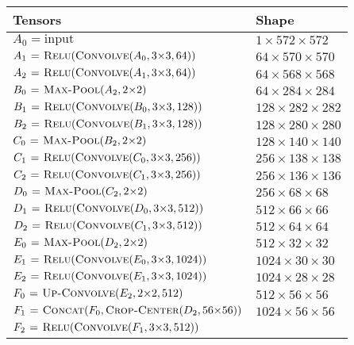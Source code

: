 \documentclass[10pt]{article}
\begin{document}
\begin{itemize}
  	\begin{table}
  	\centering
  	\begin{tabular}{l|l}
  	\textbf{Tensors} & \textbf{Shape} \\
  	\hline
  	$A_0 = \textrm{input}$
  	& $1 \times 572 \times 572$ \\
  	$A_1 \mathrel{\hspace{1pt}=\hspace{1pt}} \textnormal{\scshape Relu}(\textnormal{\scshape Convolve}(A_0, 3{\times}3, 64))$ 
  	& $64 \times 570 \times 570$ \\
  	$A_2 \mathrel{\hspace{1pt}=\hspace{1pt}} \textnormal{\scshape Relu}(\textnormal{\scshape Convolve}(A_1, 3{\times}3, 64))$ 
  	& $64 \times 568 \times 568$ \\
  	\hline
  	$B_0 \mathrel{\hspace{1pt}=\hspace{1pt}} \textnormal{\scshape Max-Pool}(A_2, 2{\times}2)$
  	& $64 \times 284 \times 284$ \\
  	$B_1 \mathrel{\hspace{1pt}=\hspace{1pt}} \textnormal{\scshape Relu}(\textnormal{\scshape Convolve}(B_0, 3{\times}3, 128))$ 
  	& $128 \times 282 \times 282$ \\
  	$B_2 \mathrel{\hspace{1pt}=\hspace{1pt}} \textnormal{\scshape Relu}(\textnormal{\scshape Convolve}(B_1, 3{\times}3, 128))$ 
  	& $128 \times 280 \times 280$ \\
  	\hline
  	$C_0 \mathrel{\hspace{1pt}=\hspace{1pt}} \textnormal{\scshape Max-Pool}(B_2, 2{\times}2)$
  	& $128 \times 140 \times 140$ \\
  	$C_1 \mathrel{\hspace{1pt}=\hspace{1pt}} \textnormal{\scshape Relu}(\textnormal{\scshape Convolve}(C_0, 3{\times}3, 256))$ 
  	& $256 \times 138 \times 138$ \\
  	$C_2 \mathrel{\hspace{1pt}=\hspace{1pt}} \textnormal{\scshape Relu}(\textnormal{\scshape Convolve}(C_1, 3{\times}3, 256))$ 
  	& $256 \times 136 \times 136$ \\
  	\hline
  	$D_0 \mathrel{\hspace{1pt}=\hspace{1pt}} \textnormal{\scshape Max-Pool}(C_2, 2{\times}2)$
  	& $256 \times 68 \times 68$ \\
  	$D_1 \mathrel{\hspace{1pt}=\hspace{1pt}} \textnormal{\scshape Relu}(\textnormal{\scshape Convolve}(D_0, 3{\times}3, 512))$ 
  	& $512 \times 66 \times 66$ \\
  	$D_2 \mathrel{\hspace{1pt}=\hspace{1pt}} \textnormal{\scshape Relu}(\textnormal{\scshape Convolve}(C_1, 3{\times}3, 512))$ 
  	& $512 \times 64 \times 64$ \\
  	\hline
  	$E_0 \mathrel{\hspace{1pt}=\hspace{1pt}} \textnormal{\scshape Max-Pool}(D_2, 2{\times}2)$
  	& $512 \times 32 \times 32$ \\
  	$E_1 \mathrel{\hspace{1pt}=\hspace{1pt}} \textnormal{\scshape Relu}(\textnormal{\scshape Convolve}(E_0, 3{\times}3, 1024))$ 
  	& $1024 \times 30 \times 30$ \\
  	$E_2 \mathrel{\hspace{1pt}=\hspace{1pt}} \textnormal{\scshape Relu}(\textnormal{\scshape Convolve}(E_1, 3{\times}3, 1024))$ 
  	& $1024 \times 28 \times 28$ \\
  	\hline\hline
  	$F_0 \mathrel{\hspace{1pt}=\hspace{1pt}} \textnormal{\scshape Up-Convolve}(E_2, 2{\times}2, 512)$
  	& $512 \times 56 \times 56$ \\
  	$F_1 \mathrel{\hspace{1pt}=\hspace{1pt}} \textnormal{\scshape Concat}(F_0, \textnormal{\scshape Crop-Center}(D_2, 56{\times}56))$
  	& $1024 \times 56 \times 56$ \\
  	$F_2 \mathrel{\hspace{1pt}=\hspace{1pt}} \textnormal{\scshape Relu}(\textnormal{\scshape Convolve}(F_1, 3{\times}3, 512))$ 

\end{tabular}
\end{table}
\end{itemize}
\end{document}
